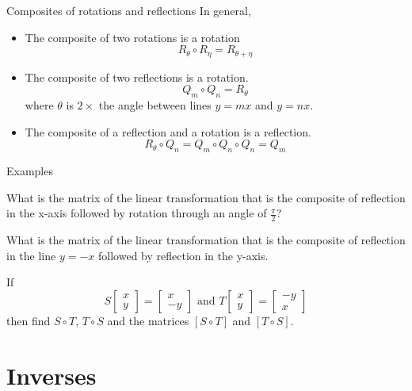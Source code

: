 \documentclass{beamer}
\begin{document}
\begin{frame}{Composites of rotations and reflections}
In general,
\begin{itemize}
\item The composite of two rotations is a rotation
\[
R_\theta\circ R_\eta=R_{\theta+\eta}
\]
\item The composite of two reflections is a rotation.
\[
Q_m\circ Q_n = R_{\theta}
\]
where $\theta$ is $2\times$ the  angle between lines $y=mx$ and $y=nx$. 
\bigskip
\item The composite of a reflection and a rotation is a 
reflection.
\[
R_{\theta}\circ Q_n
= 
Q_m\circ Q_n\circ Q_n  
=Q_m
\]
\end{itemize}
\end{frame}


\begin{frame}{Examples}
\begin{example}
What is the matrix of the linear transformation that is the composite of reflection in the x-axis followed by rotation through an angle of $\frac{\pi}{2}$?
\end{example}
\begin{example}
What is the matrix of the linear transformation that is the composite of reflection in the line $y = -x$ followed by reflection in the y-axis.
\end{example}
\begin{example}
If
\begin{equation*}
S \left[
\begin{array}{c}
x\\
y
\end{array}
\right] = \left[
\begin{array}{c}
x\\
-y
\end{array}
\right]\text{ and } T \left[
\begin{array}{c}
x\\
y
\end{array}
\right] = \left[
\begin{array}{c}
-y\\
x
\end{array}
\right]
\end{equation*}
then find $S\circ T$, $T\circ S$ and the matrices $[S\circ T]$ and $[T\circ S]$.
\end{example}
\end{frame}

\section{Inverses}
\end{document}
